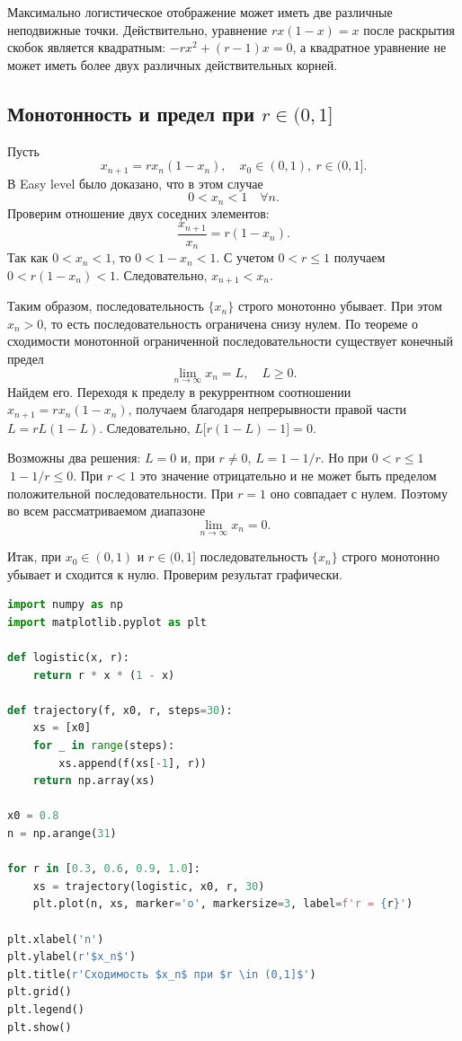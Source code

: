 \documentclass[14pt,a4paper]{extarticle}
\begin{document}
Максимально логистическое отображение может иметь две различные неподвижные точки. Действительно, уравнение $rx(1 - x) = x$ после раскрытия скобок является квадратным: $-r x^2 + (r - 1)x = 0$, а квадратное уравнение не может иметь более двух различных действительных корней.


\subsection{Монотонность и предел при $r \in (0,1]$}

Пусть
\[
x_{n+1} = rx_n(1 - x_n), \quad x_0 \in (0,1),\ r \in (0,1].
\]
В Easy level было доказано, что в этом случае
\[
0 < x_n < 1 \quad \forall n.
\]
Проверим отношение двух соседних элементов:
\[
\frac{x_{n+1}}{x_n} = r(1 - x_n).
\]
Так как $0 < x_n < 1$, то $0 < 1 - x_n < 1$. С учетом $0 < r \leq 1$ получаем $0 < r(1 - x_n) < 1$. Следовательно, $x_{n+1} < x_n$.

Таким образом, последовательность $\{x_n\}$ строго монотонно убывает. При этом $x_n > 0$, то есть последовательность ограничена снизу нулем. По теореме о сходимости монотонной ограниченной последовательности существует конечный предел
\[
\lim_{n \rightarrow \infty} x_n = L, \quad L \geq 0.
\]
Найдем его. Переходя к пределу в рекуррентном соотношении $x_{n+1} = rx_n(1 - x_n)$, получаем благодаря непрерывности правой части $L = rL(1 - L)$. Следовательно, $L \bigl[ r(1 - L)-1 \bigr] = 0$.

Возможны два решения: $L = 0$ и, при $r \neq 0$, $L = 1 - 1/r$. Но при $0 < r \leq 1\ $ $\ 1 - 1/r \leq 0$. При $r < 1$ это значение отрицательно и не может быть пределом положительной последовательности. При $r = 1$ оно совпадает с нулем. Поэтому во всем рассматриваемом диапазоне
\[
\lim_{n \rightarrow \infty} x_n = 0.
\]

Итак, при $x_0 \in (0,1)$ и $r \in (0,1]$ последовательность $\{x_n\}$ строго монотонно убывает и сходится к нулю. Проверим результат графически.

\begin{lstlisting}[language=python]
import numpy as np
import matplotlib.pyplot as plt

def logistic(x, r):
    return r * x * (1 - x)

def trajectory(f, x0, r, steps=30):
    xs = [x0]
    for _ in range(steps):
        xs.append(f(xs[-1], r))
    return np.array(xs)

x0 = 0.8
n = np.arange(31)

for r in [0.3, 0.6, 0.9, 1.0]:
    xs = trajectory(logistic, x0, r, 30)
    plt.plot(n, xs, marker='o', markersize=3, label=f'r = {r}')

plt.xlabel('n')
plt.ylabel(r'$x_n$')
plt.title(r'Сходимость $x_n$ при $r \in (0,1]$')
plt.grid()
plt.legend()
plt.show()
\end{lstlisting}
\end{document}
